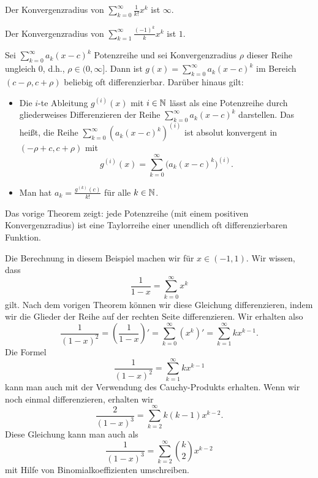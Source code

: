 \begin{bsp} 
	Der Konvergenzradius von $\sum_{k=0}^\infty \frac{1}{k!} x^k$ ist $\infty$. 
\end{bsp} 

\begin{bsp} 
	Der Konvergenzradius von $\sum_{k=1}^\infty \frac{(-1)^k}{k} x^k$ ist $1$. 
\end{bsp} 

\begin{thm}
	Sei $\sum_{k=0}^\infty a_k (x-c)^k$ Potenzreihe und sei Konvergenzradius $\rho$ dieser Reihe ungleich $0$, d.h., $\rho \in (0,\infty]$. Dann ist $g(x) = \sum_{k=0}^\infty a_k (x-c)^k$ im Bereich $(c-\rho,c+\rho)$ beliebig oft differenzierbar. Darüber hinaus gilt:  
	\begin{itemize} 
	\item Die	$i$-te Ableitung $g^{(i)} (x)$ mit $i \in \mathbb{N}$ lässt als eine Potenzreihe durch gliederweises Differenzieren der Reihe $\sum_{k=0}^\infty a_k (x-c)^k$ darstellen. Das heißt, die Reihe $\sum_{k=0}^\infty ( a_k (x-c)^k)^{(i)}$ ist absolut konvergent in $(-\rho + c,c+\rho)$ mit
	\[
		g^{(i)}( x) = \sum_{k=0}^\infty \bigl( a_k (x-c)^k \bigr)^{(i)}.
	\]
	\item Man hat $a_k = \frac{g^{(k)}(c)}{k!}$ für alle $k \in \mathbb{N}$. 
	\end{itemize} 
\end{thm} 


\begin{bem}
	Das vorige Theorem zeigt: jede Potenzreihe (mit einem positiven Konvergenzradius) ist eine Taylorreihe einer unendlich oft differenzierbaren Funktion. 
\end{bem} 

\begin{bsp}
	Die Berechnung in diesem Beispiel machen wir für $x \in (-1,1)$. 
	Wir wissen, dass 
	\[
		\frac{1}{1-x} = \sum_{k=0}^\infty x^k
	\]
	gilt. Nach dem vorigen Theorem können wir diese Gleichung differenzieren, indem wir die Glieder der Reihe auf der rechten Seite differenzieren. Wir erhalten also 
	\[
		\frac{1}{(1-x)^2} = \left( \frac{1}{1-x} \right)' =  \sum_{k=0}^\infty (x^k)' = \sum_{k=1}^\infty k x^{k-1}. 
	\]
	Die Formel
	\[
		\frac{1}{(1-x)^2} = \sum_{k=1}^\infty k x^{k-1}
	\]
	kann man auch mit der Verwendung des Cauchy-Produkts erhalten. Wenn wir noch einmal differenzieren, erhalten wir 
	\[
		\frac{2}{(1-x)^3} =\sum_{k=2}^\infty k (k-1) x^{k-2}. 
	\]
	Diese Gleichung kann man auch als 
	\[
		\frac{1}{(1-x)^3} = \sum_{k=2}^\infty \binom{k}{2} x^{k-2} 
	\]
	mit Hilfe von Binomialkoeffizienten umschreiben. 
\end{bsp} 

